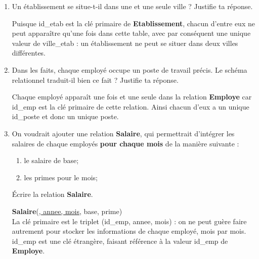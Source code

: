 \documentclass[a4paper,12pt]{article}
\begin{document}
\begin{enumerate}[\bfseries 1.]
	\item 	Un établissement se situe-t-il dans une et une seule ville ? Justifie ta réponse.

    \begin{encadre}[Réponse]
    Puisque id\_etab est la clé primaire de \textbf{Etablissement}, chacun d'entre eux ne peut apparaître qu'une fois dans cette table, avec par conséquent une unique valeur de ville\_etab : un établissement ne peut se situer dans deux villes différentes.
    \end{encadre}
	\item 	Dans les faits, chaque employé occupe un poste de travail précis. Le schéma relationnel traduit-il bien ce fait ? Justifie ta réponse.
            \begin{encadre}[Réponse]
            Chaque employé apparaît une fois et une seule dans la relation \textbf{Employe} car id\_emp est la clé primaire de cette relation. Ainsi chacun d'eux a un unique id\_poste et donc un unique poste.
            \end{encadre}

    \item   On voudrait ajouter une relation \textbf{Salaire}, qui permettrait d'intégrer les salaires de chaque employés \textbf{pour chaque mois} de la manière suivante :
            \begin{enumerate}[--]
            	\item 	le salaire de base;
            	\item 	les primes pour le mois;
            \end{enumerate}
            Écrire la relation \textbf{Salaire}.

            \begin{encadre}[Réponse]
            \textbf{Salaire}(\uline{, annee, mois}, base, prime)\\

            La clé primaire est le triplet (id\_emp, annee, mois) : on ne peut guère faire autrement pour stocker les informations de chaque employé, mois par mois.\\

            id\_emp est une clé étrangère, faisant référence à la valeur id\_emp de \textbf{Employe}.
            \end{encadre}
\end{enumerate}

\exo{}\\
\end{document}
